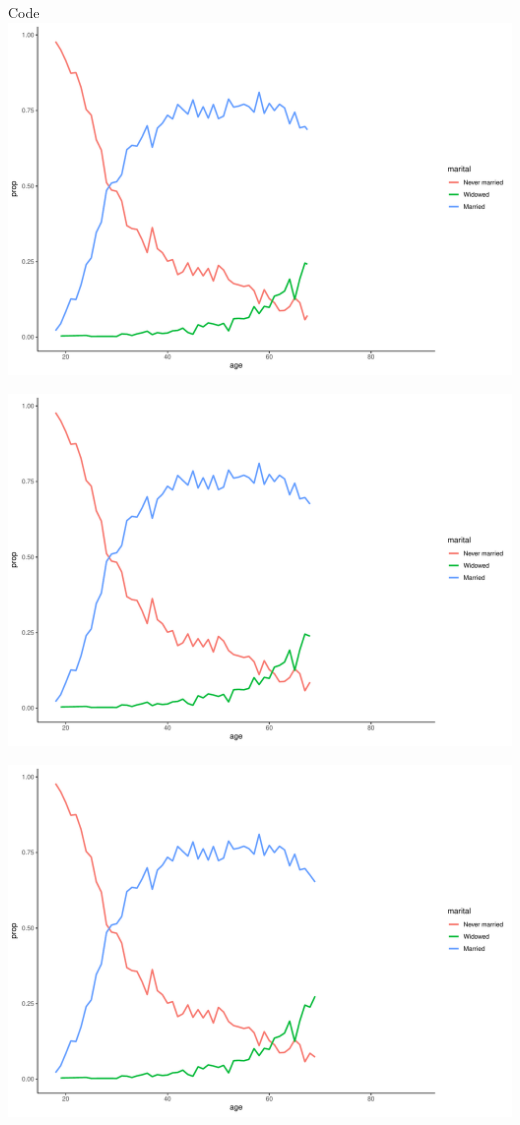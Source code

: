\documentclass[
  ignorenonframetext,
]{beamer}
\begin{document}
\begin{frame}[fragile]{Code}
\includegraphics{gss_cat_files/figure-beamer/unnamed-chunk-1-74.pdf}

\includegraphics{gss_cat_files/figure-beamer/unnamed-chunk-1-75.pdf}

\includegraphics{gss_cat_files/figure-beamer/unnamed-chunk-1-76.pdf}


\end{frame}
\end{document}
